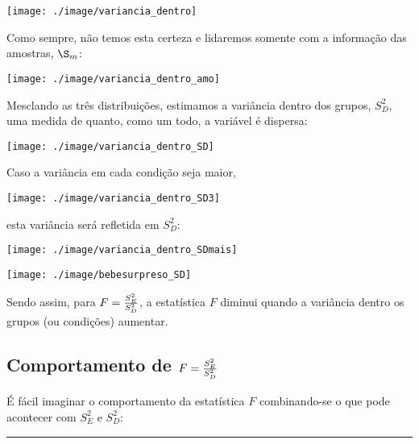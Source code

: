 \documentclass[]{article}
\begin{document}
\begin{center}\texttt{[image: ./image/variancia\_dentro]} \end{center}

Como sempre, não temos esta certeza e lidaremos somente com a informação
das amostras, \(\S_m\):

\begin{center}\texttt{[image: ./image/variancia\_dentro\_amo]} \end{center}

Mesclando as três distribuições, estimamos a variância dentro dos
grupos, \(S_D^2\), uma medida de quanto, como um todo, a variável é
dispersa:

\begin{center}\texttt{[image: ./image/variancia\_dentro\_SD]} \end{center}

Caso a variância em cada condição seja maior,

\begin{center}\texttt{[image: ./image/variancia\_dentro\_SD3]} \end{center}

esta variância será refletida em \(S_D^2\):

\begin{center}\texttt{[image: ./image/variancia\_dentro\_SDmais]} \end{center}

\begin{center}\texttt{[image: ./image/bebesurpreso\_SD]} \end{center}

Sendo assim, para \(F = {{S_E^2}\over{S_D^2}}\), a estatística \(F\)
diminui quando a variância dentro os grupos (ou condições) aumentar.

\subsection{\texorpdfstring{Comportamento de
\(F = {{S_E^2}\over{S_D^2}}\)}{Comportamento de F = \{\{S\_E\^{}2\}\textbackslash{}over\{S\_D\^{}2\}\}}}\label{comportamento-de-f-s_e2overs_d2}

É fácil imaginar o comportamento da estatística \(F\) combinando-se o
que pode acontecer com \(S_E^2\) e \(S_D^2\):

\begin{center}\rule{0.5\linewidth}{\linethickness}\end{center}
\end{document}
